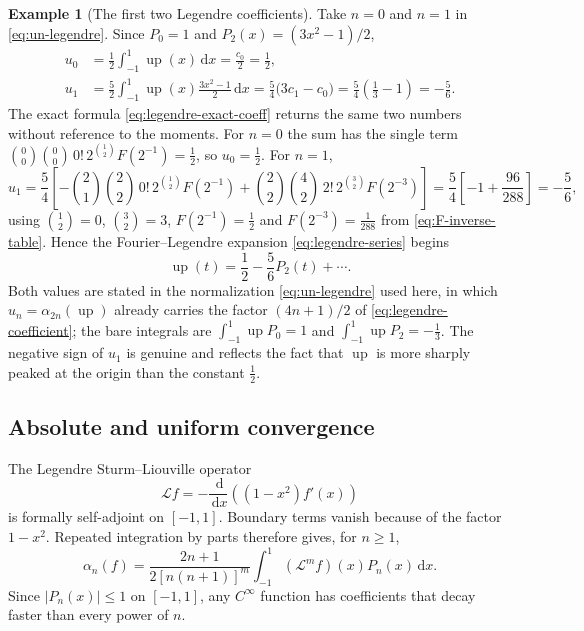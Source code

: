 \documentclass[11pt,oneside]{article}
\theoremstyle{definition}
\newtheorem{example}[theorem]{Example}
\theoremstyle{remark}
\newcommand{\Up}{\operatorname{up}}
\newcommand{\dd}{\,\mathrm d}
\begin{document}
\begin{example}[The first two Legendre coefficients]        \label{ex:mom-legendre-first}
Take $n=0$ and $n=1$ in \eqref{eq:un-legendre}.  Since $P_0=1$ and
$P_2(x)=(3x^2-1)/2$,
\begin{align*}
 u_0&=\frac12\int_{-1}^{1}\Up(x)\dd x=\frac{c_0}{2}=\frac12,\\
 u_1&=\frac52\int_{-1}^{1}\Up(x)\frac{3x^2-1}{2}\dd x
 =\frac54\bigl(3c_1-c_0\bigr)=\frac54\left(\frac13-1\right)=-\frac56 .
\end{align*}
The exact formula \eqref{eq:legendre-exact-coeff} returns the same two numbers without
reference to the moments.  For $n=0$ the sum has the single term
$\binom00\binom00\,0!\,2^{\binom12}F(2^{-1})=\tfrac12$, so $u_0=\tfrac12$.  For $n=1$,
\begin{equation*}
 u_1=\frac54\left[-\binom21\binom22\,0!\,2^{\binom12}F(2^{-1})
 +\binom22\binom42\,2!\,2^{\binom32}F(2^{-3})\right]
 =\frac54\left[-1+\frac{96}{288}\right]=-\frac56,
\end{equation*}
using $\binom12=0$, $\binom32=3$, $F(2^{-1})=\tfrac12$ and $F(2^{-3})=\tfrac1{288}$ from
\eqref{eq:F-inverse-table}.  Hence the Fourier--Legendre expansion \eqref{eq:legendre-series}
begins
\begin{equation}
 \Up(t)=\frac12-\frac56P_2(t)+\cdots.                       \label{eq:mom-legendre-first-terms}
\end{equation}
Both values are stated in the normalization \eqref{eq:un-legendre} used here, in which
$u_n=\alpha_{2n}(\Up)$ already carries the factor $(4n+1)/2$ of
\eqref{eq:legendre-coefficient}; the bare integrals are
$\int_{-1}^{1}\Up P_0=1$ and $\int_{-1}^{1}\Up P_2=-\tfrac13$.  The negative sign of $u_1$ is
genuine and reflects the fact that $\Up$ is more sharply peaked at the origin than the
constant $\tfrac12$.
\end{example}

\subsection{Absolute and uniform convergence}

The Legendre Sturm--Liouville operator
\begin{equation}
 \mathcal Lf=-\frac{\dd}{\dd x}\left((1-x^2)f'(x)\right)   \label{eq:SL-operator}
\end{equation}
is formally self-adjoint on $[-1,1]$.  Boundary terms vanish because of the factor
$1-x^2$.  Repeated integration by parts therefore gives, for $n\ge1$,
\begin{equation}
 \alpha_n(f)=\frac{2n+1}{2[n(n+1)]^m}
 \int_{-1}^{1}(\mathcal L^mf)(x)P_n(x)\dd x.              \label{eq:legendre-decay-ibp}
\end{equation}
Since $|P_n(x)|\le1$ on $[-1,1]$, any $C^\infty$ function has coefficients that decay faster
than every power of $n$.
\end{document}
